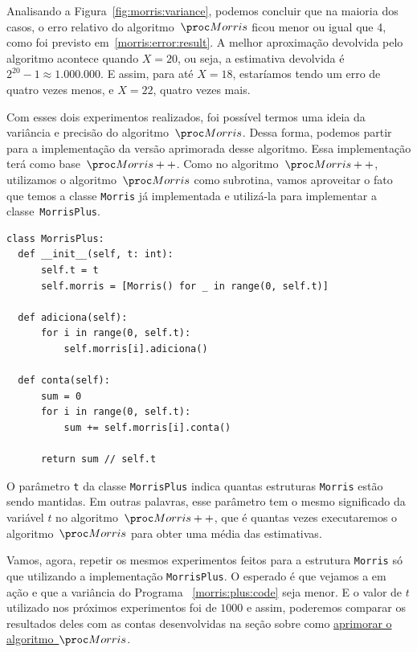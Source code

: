 Analisando a Figura~\ref{fig:morris:variance}, podemos concluir que na maioria dos casos, o erro relativo do 
algoritmo~$\Morris$ ficou menor ou igual que 4, como foi previsto em~\eqref{morris:error:result}. A melhor aproximação 
devolvida pelo algoritmo acontece quando $X = 20$, ou seja, a estimativa devolvida é $2^{20} - 1 \approx 1.000.000$. E 
assim, para até $X = 18$, estaríamos tendo um erro de quatro vezes menos, e $X = 22$, quatro vezes mais.

Com esses dois experimentos realizados, foi possível termos uma ideia da variância e precisão do algoritmo~$\Morris$. 
Dessa forma, podemos partir para a implementação da versão aprimorada desse algoritmo. Essa implementação terá como 
base~$\Morrispp$. Como no algoritmo~$\Morrispp$, utilizamos o algoritmo~$\Morris$ como subrotina, vamos aproveitar o 
fato que temos a classe \texttt{Morris} já implementada e utilizá-la para implementar a classe~\texttt{MorrisPlus}.

\newpage
\begin{lstlisting}[style=mypython,caption=Implementação do algoritmo $\Morrispp$,captionpos=b, label=morris:plus:code]
class MorrisPlus:
  def __init__(self, t: int):
      self.t = t
      self.morris = [Morris() for _ in range(0, self.t)]

  def adiciona(self):
      for i in range(0, self.t):
          self.morris[i].adiciona()

  def conta(self):
      sum = 0
      for i in range(0, self.t):
          sum += self.morris[i].conta()

      return sum // self.t
\end{lstlisting}

O parâmetro \texttt{t} da classe \texttt{MorrisPlus} indica quantas estruturas \texttt{Morris} estão sendo mantidas. Em 
outras palavras, esse parâmetro tem o mesmo significado da variável $t$ no algoritmo~$\Morrispp$, que é quantas vezes 
executaremos o algoritmo~$\Morris$ para obter uma média das estimativas.

Vamos, agora, repetir os mesmos experimentos feitos para a estrutura \texttt{Morris} só que utilizando a implementação 
\texttt{MorrisPlus}. O esperado é que vejamos a  em ação e que a variância do Programa
~\ref{morris:plus:code} seja menor. E o valor de $t$ utilizado nos próximos experimentos foi de $1000$ e assim, 
poderemos comparar os resultados deles com as contas desenvolvidas na seção sobre como 
\hyperref[sec:morris:plus]{aprimorar o algoritmo~$\Morris$}.

